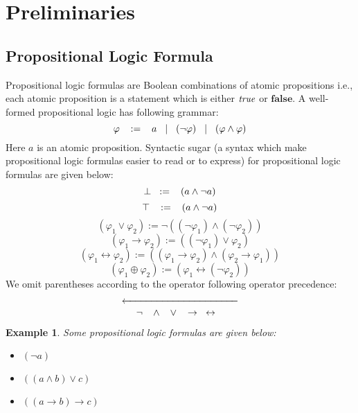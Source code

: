 \newtheorem{example}{Example}
\section{Preliminaries}
\label{sec:preliminaries}
\subsection{Propositional Logic Formula}
Propositional logic formulas are Boolean combinations of atomic propositions i.e., each atomic proposition is a statement which is either $\emph{true}$ or $\mathbf{false}$. A well-formed propositional logic has following grammar:
$$\varphi\hspace{3mm} :=\hspace{3mm} a\hspace{3mm} |\hspace{3mm} (\neg \varphi)\hspace{3mm} |\hspace{3mm} (\varphi \wedge \varphi)$$
Here $a$ is an atomic proposition.\newline
Syntactic sugar (a syntax which make propositional logic formulas easier to read or to express) for propositional logic formulas are given below:
$$\perp\hspace{3mm}:=\hspace{3mm}(a\wedge\neg a)$$
$$\top\hspace{3mm}:=\hspace{3mm}(a\wedge\neg a)$$
$$(\varphi_{1}\vee\varphi_{2}) := \neg((\neg \varphi_{1}) \wedge (\neg \varphi_{2})) $$
$$(\varphi_{1}\rightarrow\varphi_{2}) := ((\neg \varphi_{1}) \vee \varphi_{2}) $$
$$(\varphi_{1}\leftrightarrow\varphi_{2}) := ( (\varphi_{1}\rightarrow\varphi_{2}) \wedge (\varphi_{2}\rightarrow\varphi_{1}))$$
$$(\varphi_{1}\oplus\varphi_{2}) := (\varphi_{1} \leftrightarrow (\neg \varphi_{2})) $$
We omit parentheses according to the operator following operator precedence:
\[ \xleftarrow{\hspace*{4cm}} \]
$$\neg\hspace{3mm} \wedge\hspace{3mm} \vee\hspace{3mm} \rightarrow\hspace{3mm} \leftrightarrow\hspace{3mm} $$
\begin{example}
	Some propositional logic formulas are given below:
	\begin{itemize}
	\item $(\neg a)$
	\item $((a\wedge b)\vee c)$
	\item $((a\rightarrow b)\rightarrow c)$
	\end{itemize}
\end{example}
